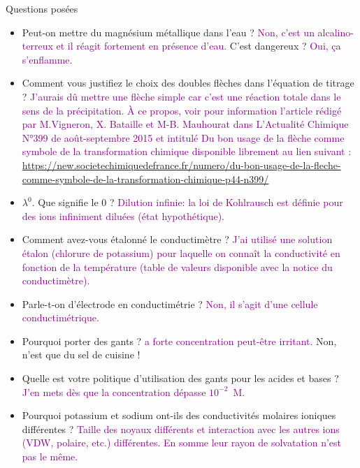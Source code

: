 \begin{reportBlock}{Questions posées}
\begin{itemize}
\item Peut-on mettre du magnésium métallique dans l'eau ? \textcolor{purple}{Non, c'est un alcalino-terreux et il réagit fortement en présence d'eau.} C'est dangereux ? \textcolor{purple}{Oui, ça s'enflamme.}

\item Comment vous justifiez le choix des doubles flèches dans l'équation de titrage ? \textcolor{purple}{J'aurais dû mettre une flèche simple car c'est une réaction totale dans le sens de la précipitation. À ce propos, voir pour information l'article rédigé par M.Vigneron, X. Bataille et M-B. Mauhourat dans L'Actualité Chimique N°399 de août-septembre 2015 et intitulé \og Du bon usage de la flèche comme symbole de la transformation chimique  \fg{} disponible librement au lien suivant : \url{https://new.societechimiquedefrance.fr/numero/du-bon-usage-de-la-fleche-comme-symbole-de-la-transformation-chimique-p44-n399/}}

\item $\lambda^0$. Que signifie le $0$ ? \textcolor{purple}{Dilution infinie: la loi de Kohlrausch est définie pour des ions infiniment diluées (état hypothétique).}

\item Comment avez-vous étalonné le conductimètre ? \textcolor{purple}{J'ai utilisé une solution étalon  (chlorure de potassium) pour laquelle on connaît la conductivité en fonction de la température (table de valeurs disponible avec la notice du conductimètre).}

\item Parle-t-on d'électrode en conductimétrie ? \textcolor{purple}{Non, il s'agit d'une cellule conductimétrique.}

\item Pourquoi porter des gants ? \textcolor{purple}{ a forte concentration peut-être irritant.} Non,  n'est que du sel de cuisine !

\item Quelle est votre politique d'utilisation des gants pour les acides et bases ? \textcolor{purple}{J'en mets dès que la concentration dépasse $10^{-2}$~M.}

\item Pourquoi potassium et sodium ont-ils des conductivités molaires ioniques différentes ? \textcolor{purple}{Taille des noyaux différents et interaction avec les autres ions (VDW, polaire, etc.) différentes. En somme leur rayon de solvatation n'est pas le même.}


\end{itemize}
\end{reportBlock}
